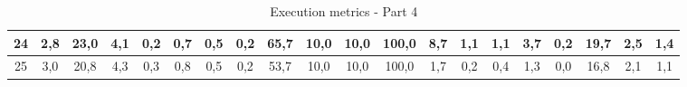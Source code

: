 \begin{sidewaystable}[]
\begin{tabular}{|c|c|c|c|c|c|c|c|c|c|c|c|c|c|c|c|c|c|c|c|}
    24 & 2,8                                              & 23,0                                             & 4,1                                              & 0,2                                              & 0,7                                              & 0,5                                              & 0,2                                              & 65,7                                            & 10,0                                            & 10,0                                            & 100,0                                           & 8,7                                             & 1,1                                             & 1,1                                             & 3,7                                             & 0,2                                             & 19,7                                             & 2,5                                              & 1,4                                              \\ \hline
    25 & 3,0                                              & 20,8                                             & 4,3                                              & 0,3                                              & 0,8                                              & 0,5                                              & 0,2                                              & 53,7                                            & 10,0                                            & 10,0                                            & 100,0                                           & 1,7                                             & 0,2                                             & 0,4                                             & 1,3                                             & 0,0                                             & 16,8                                             & 2,1                                              & 1,1                                              \\ \hline
    \end{tabular}
    \caption{Execution metrics - Part 4}
    \label{tab:ap:exec_metrics_4}
\end{sidewaystable}


